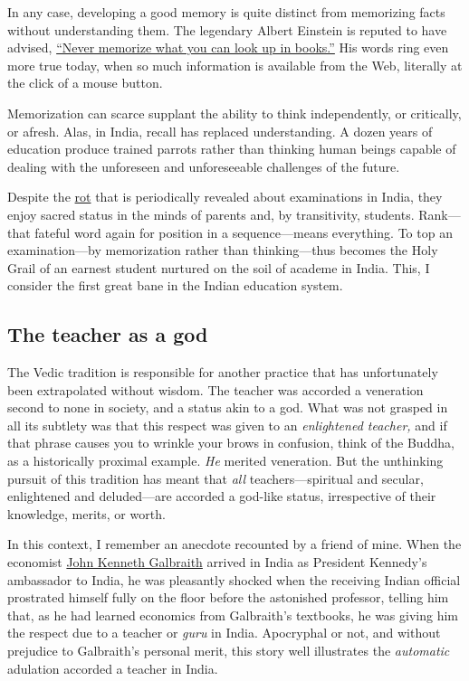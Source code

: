 \documentclass[
  a4paper,
]{article}
\begin{document}
In any case, developing a good memory is quite distinct from memorizing
facts without understanding them. The legendary Albert Einstein is
reputed to have advised,
\href{http://en.wikiquote.org/wiki/Albert_Einstein}{``Never memorize
what you can look up in books.''} His words ring even more true today,
when so much information is available from the Web, literally at the
click of a mouse button.

Memorization can scarce supplant the ability to think independently, or
critically, or afresh. Alas, in India, recall has replaced
understanding. A dozen years of education produce trained parrots rather
than thinking human beings capable of dealing with the unforeseen and
unforeseeable challenges of the future.

Despite the
\href{http://deedy.quora.com/Hacking-into-the-Indian-Education-System}{rot}
that is periodically revealed about examinations in India, they enjoy
sacred status in the minds of parents and, by transitivity, students.
Rank---that fateful word again for position in a sequence---means
everything. To top an examination---by memorization rather than
thinking---thus becomes the Holy Grail of an earnest student nurtured on
the soil of academe in India. This, I consider the first great bane in
the Indian education system.

\hypertarget{the-teacher-as-a-god}{%
\subsection{The teacher as a god}\label{the-teacher-as-a-god}}

The Vedic tradition is responsible for another practice that has
unfortunately been extrapolated without wisdom. The teacher was accorded
a veneration second to none in society, and a status akin to a god. What
was not grasped in all its subtlety was that this respect was given to
an \emph{enlightened teacher,} and if that phrase causes you to wrinkle
your brows in confusion, think of the Buddha, as a historically proximal
example. \emph{He} merited veneration. But the unthinking pursuit of
this tradition has meant that \emph{all} teachers---spiritual and
secular, enlightened and deluded---are accorded a god-like status,
irrespective of their knowledge, merits, or worth.

In this context, I remember an anecdote recounted by a friend of mine.
When the economist
\href{http://en.wikipedia.org/wiki/John_Kenneth_Galbraith}{John Kenneth
Galbraith} arrived in India as President Kennedy's ambassador to India,
he was pleasantly shocked when the receiving Indian official prostrated
himself fully on the floor before the astonished professor, telling him
that, as he had learned economics from Galbraith's textbooks, he was
giving him the respect due to a teacher or \emph{guru} in India.
Apocryphal or not, and without prejudice to Galbraith's personal merit,
this story well illustrates the \emph{automatic} adulation accorded a
teacher in India.
\end{document}
